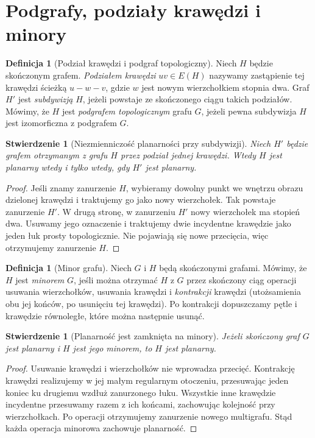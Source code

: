 \documentclass[11pt,a4paper]{report}
\numberwithin{equation}{section}
\theoremstyle{plain}
\newtheorem{stwierdzenie}[twierdzenie]{Stwierdzenie}
\theoremstyle{definition}
\newtheorem{definicja}[twierdzenie]{Definicja}
\theoremstyle{remark}
\begin{document}
\section{Podgrafy, podziały krawędzi i minory}
\label{sec:tg-rozne-redukcje}

\begin{definicja}[Podział krawędzi i podgraf topologiczny]
Niech $H$ będzie skończonym grafem. \emph{Podziałem krawędzi}
$uv\in E(H)$ nazywamy zastąpienie tej krawędzi ścieżką
$u-w-v$, gdzie $w$ jest nowym wierzchołkiem stopnia dwa.
Graf $H'$ jest \emph{subdywizją} $H$, jeżeli powstaje ze skończonego
ciągu takich podziałów. Mówimy, że $H$ jest \emph{podgrafem
topologicznym} grafu $G$, jeżeli pewna subdywizja $H$
jest izomorficzna z podgrafem $G$.
\end{definicja}

\begin{stwierdzenie}[Niezmienniczość planarności przy subdywizji]
Niech $H'$ będzie grafem otrzymanym z grafu $H$ przez podział
jednej krawędzi. Wtedy $H$ jest planarny wtedy i tylko wtedy,
gdy $H'$ jest planarny.
\end{stwierdzenie}

\begin{proof}
Jeśli znamy zanurzenie $H$, wybieramy dowolny punkt we wnętrzu
obrazu dzielonej krawędzi i traktujemy go jako nowy wierzchołek.
Tak powstaje zanurzenie $H'$.
W drugą stronę, w zanurzeniu $H'$ nowy wierzchołek ma stopień
dwa. Usuwamy jego oznaczenie i traktujemy dwie incydentne
krawędzie jako jeden łuk prosty topologicznie.
Nie pojawiają się nowe przecięcia, więc otrzymujemy zanurzenie $H$.
\end{proof}

\begin{definicja}[Minor grafu]
Niech $G$ i $H$ będą skończonymi grafami. Mówimy, że
$H$ jest \emph{minorem} $G$, jeśli można otrzymać $H$
z $G$ przez skończony ciąg operacji usuwania wierzchołków,
usuwania krawędzi i \emph{kontrakcji} krawędzi (utożsamienia
obu jej końców, po usunięciu tej krawędzi).
Po kontrakcji dopuszczamy pętle i krawędzie równoległe,
które można następnie usunąć.
\end{definicja}

\begin{stwierdzenie}[Planarność jest zamknięta na minory]
Jeżeli skończony graf $G$ jest planarny i $H$ jest jego minorem,
to $H$ jest planarny.
\end{stwierdzenie}

\begin{proof}
Usuwanie krawędzi i wierzchołków nie wprowadza przecięć.
Kontrakcję krawędzi realizujemy w jej małym regularnym
otoczeniu, przesuwając jeden koniec ku drugiemu wzdłuż
zanurzonego łuku. Wszystkie inne krawędzie incydentne
przesuwamy razem z ich końcami, zachowując kolejność
przy wierzchołkach. Po operacji otrzymujemy zanurzenie
nowego multigrafu. Stąd każda operacja minorowa zachowuje planarność.
\end{proof}
\end{document}
